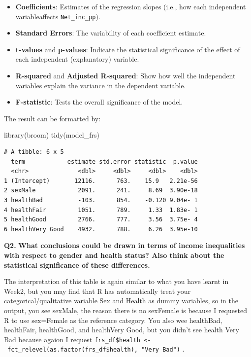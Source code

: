 \documentclass[
  letterpaper,
  DIV=11,
  numbers=noendperiod]{scrreprt}
\newenvironment{Shaded}{\begin{snugshade}}{\end{snugshade}}
\newcommand{\FunctionTok}[1]{\textcolor[rgb]{0.28,0.35,0.67}{#1}}
\newcommand{\NormalTok}[1]{\textcolor[rgb]{0.00,0.23,0.31}{#1}}
\providecommand{\tightlist}{%
  \setlength{\itemsep}{0pt}\setlength{\parskip}{0pt}}\usepackage{longtable,booktabs,array}
\begin{document}
\begin{itemize}
\tightlist
\item
  \textbf{Coefficients}: Estimates of the regression slopes (i.e., how
  each independent variableaffects \texttt{Net\_inc\_pp}).
\item
  \textbf{Standard Errors}: The variability of each coefficient
  estimate.
\item
  \textbf{t-values} and \textbf{p-values}: Indicate the statistical
  significance of the effect of each independent (explanatory) variable.
\item
  \textbf{R-squared} and \textbf{Adjusted R-squared}: Show how well the
  independent variables explain the variance in the dependent variable.
\item
  \textbf{F-statistic}: Tests the overall significance of the model.
\end{itemize}

The result can be formatted by:

\begin{Shaded}
\begin{Highlighting}[]
\FunctionTok{library}\NormalTok{(broom) }
\FunctionTok{tidy}\NormalTok{(model\_frs)}
\end{Highlighting}
\end{Shaded}

\begin{verbatim}
# A tibble: 6 x 5
  term            estimate std.error statistic  p.value
  <chr>              <dbl>     <dbl>     <dbl>    <dbl>
1 (Intercept)       12116.      763.    15.9   2.21e-56
2 sexMale            2091.      241.     8.69  3.90e-18
3 healthBad          -103.      854.    -0.120 9.04e- 1
4 healthFair         1051.      789.     1.33  1.83e- 1
5 healthGood         2766.      777.     3.56  3.75e- 4
6 healthVery Good    4932.      788.     6.26  3.95e-10
\end{verbatim}

\textbf{Q2.} \textbf{What conclusions could be drawn in terms of income
inequalities with respect to gender and health status? Also think about
the statistical significance of these differences.}

The interpretation of this table is again similar to what you have
learnt in Week2, but you may find that R has automatically treat your
categorical/qualitative variable Sex and Health as dummy variables, so
in the output, you see sexMale, the reason there is no sexFemale is
because I requested R to use sex=Female as the reference category. You
also wee healthBad, healthFair, healthGood, and healthVery Good, but you
didn't see health Very Bad because agaion I request
\texttt{frs\_df\$health\ \textless{}-\ fct\_relevel(as.factor(frs\_df\$health),\ "Very\ Bad")}
.
\end{document}
